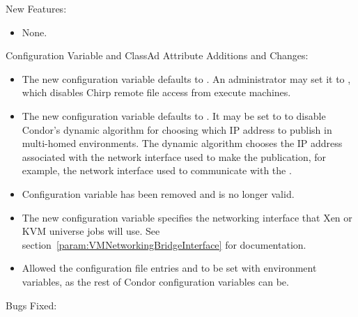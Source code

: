 \noindent New Features:

\begin{itemize}

\item None.

\end{itemize}

\noindent Configuration Variable and ClassAd Attribute Additions and Changes:

\begin{itemize}

\item The new configuration variable  
defaults to . 
An administrator may set it to , which 
disables Chirp remote file access from execute machines.

\item The new configuration variable
   defaults to .  It may
  be set to  to disable Condor's dynamic algorithm for choosing
  which IP address to publish in multi-homed environments.  The dynamic
  algorithm chooses the IP address associated with the network interface
  used to make the publication, for example, the network interface used 
  to communicate with the .

\item Configuration variable  has been removed
  and is no longer valid.

\item The new configuration variable
   specifies the networking interface
  that Xen or KVM  universe jobs will use.
  See section~\ref{param:VMNetworkingBridgeInterface} for documentation.

\item
Allowed the configuration file entries 
and  to be set with environment variables,
as the rest of Condor configuration variables can be.

\end{itemize}

\noindent Bugs Fixed:

